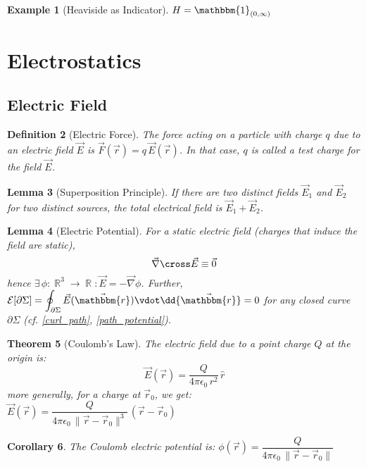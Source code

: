 \documentclass[12pt]{article}
\renewcommand{\grad}{\vec{\nabla}}
\renewcommand{\div}{\vec{\nabla}\vdot}
\renewcommand{\curl}{\vec{\nabla}\cross}
\newcommand{\Exist}[1]{\exists\,{#1}:}
\DeclareMathOperator{\R}{\mathbb{R}}
\newcommand*{\rv}{\vec{r}}
\newcommand*{\rhat}{\hat{r}}
\newcommand*{\vF}{\vec{F}}
\newcommand*{\irv}{\vec{\mathbbm{r}}}
\newcommand*{\ind}{\mathbbm{1}}
\newcommand*{\vE}{\vec{E}}
\newcommand*{\ee}{\epsilon_0}
\newtheorem{theorem}{Theorem}[subsection]
\newtheorem{definition}[theorem]{Definition}
\newtheorem{lemma}[theorem]{Lemma}
\newtheorem{corollary}[theorem]{Corollary}
\newtheorem{example}[theorem]{Example}
\begin{document}
\begin{example}[Heaviside as Indicator]
  $H=\ind_{(0,\infty)}$
\end{example}

\pagebreak

\section{Electrostatics}

\subsection{Electric Field}

\begin{definition}[Electric Force]
  The force acting on a particle with charge $q$ due to an electric field $\vE$ is $\vF(\rv)=q\,\vE(\rv)$. In that case, $q$ is called a test charge for the field $\vE$.
\end{definition}

\begin{lemma}[Superposition Principle]
  If there are two distinct fields $\vE_1$ and $\vE_2$ for two distinct sources, the total electrical field is $\vE_1+\vE_2$.
\end{lemma}

\begin{lemma}[Electric Potential]
  \label{faraday_potential}
  For a static electric field (charges that induce the field are static), $$\curl\vE\equiv\vec{0}$$ hence $\Exist{\phi:\R^3\to\R}\vE=-\grad\phi$. Further, $\mathcal{E}[\partial\Sigma]=\displaystyle\oint_{\partial\Sigma}\vE(\irv)\vdot\dd{\irv}=0$ for any closed curve $\partial\Sigma$ (cf. \ref{curl_path}, \ref{path_potential}).
\end{lemma}

\begin{theorem}[Coulomb's Law]
  The electric field due to a point charge $Q$ at the origin is: $$\vE(\rv)=\frac{Q}{4\pi\ee\,r^2}\,\rhat$$ more generally, for a charge at $\rv_0$, we get: $\vE(\rv)=\dfrac{Q}{4\pi\ee\,\|\rv-\rv_0\|^3}\,(\rv-\rv_0)$
\end{theorem}


\begin{corollary}
  The Coulomb electric potential is: $\phi(\rv)=\dfrac{Q}{4\pi\ee\,\|\rv-\rv_0\|}$
\end{corollary}
\end{document}
